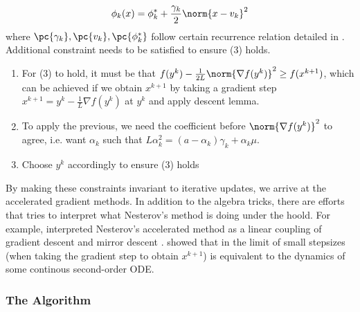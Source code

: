 \documentclass[../summary.tex]{subfiles}
\begin{document}
\[
    \phi_k(x)
        = \phi_k^* + \frac{\gamma_k}{2} \norm{x-v_k}^2    
\]
where $\pc{\gamma_k}, \pc{v_k}, \pc{\phi_k^*}$ follow certain recurrence relation detailed in \cite{nesterovIntroductoryLecturesConvex2004}. Additional constraint needs to be satisfied to ensure (3) holds. 
\begin{enumerate}
    \item For (3) to hold, it must be that $f(y^k) - \frac{1}{2L} \norm{\nabla f(y^k)}^2 \geq f(x^{k+1})$, which can be achieved if we obtain $x^{k+1}$ by taking a gradient step $x^{k+1} = y^k - \frac{1}{L} \nabla f(y^k)$ at $y^k$ and apply descent lemma.
    \item To apply the previous, we need the coefficient before $\norm{\nabla f(y^k)}^2$ to agree, i.e. want $\alpha_k$ such that $L\alpha_k^2 = (a-\alpha_k) \gamma_k + \alpha_k \mu$.
    \item Choose $y^k$ accordingly to ensure (3) holds
\end{enumerate}
By making these constraints invariant to iterative updates, we arrive at the accelerated gradient methods. In addition to the algebra tricks, there are efforts that tries to interpret what Nesterov's method is doing under the hoold. For example, \cite{allen-zhuLinearCouplingUltimate2016} interpreted Nesterov's accelerated method as a linear coupling of gradient descent and mirror descent . \cite{suDifferentialEquationModeling2015} showed that in the limit of small stepsizes (when taking the gradient step to obtain $x^{k+1}$) is equivalent to the dynamics of some continous second-order ODE.


\subsubsection{The Algorithm}
\end{document}
